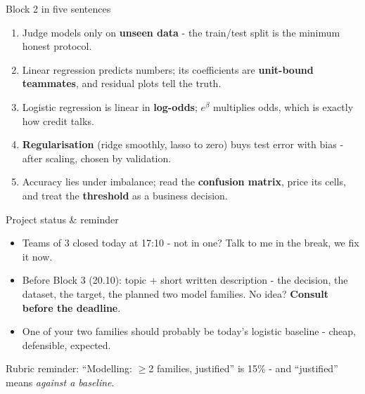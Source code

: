 \documentclass[10pt,aspectratio=169]{beamer}
\begin{document}
\begin{frame}{Block 2 in five sentences}
  \begin{enumerate}
    \item Judge models only on \textbf{unseen data} - the train/test split
          is the minimum honest protocol.
    \item Linear regression predicts numbers; its coefficients are
          \textbf{unit-bound teammates}, and residual plots tell the truth.
    \item Logistic regression is linear in \textbf{log-odds}; $e^{\beta}$
          multiplies odds, which is exactly how credit talks.
    \item \textbf{Regularisation} (ridge smoothly, lasso to zero) buys test
          error with bias - after scaling, chosen by validation.
    \item Accuracy lies under imbalance; read the \textbf{confusion matrix},
          price its cells, and treat the \textbf{threshold} as a business
          decision.
  \end{enumerate}
\end{frame}

\begin{frame}{Project status \& reminder}
  \begin{itemize}
    \item Teams of 3 closed \alert{today at 17:10} - not in one? Talk to me
          in the break, we fix it now.
    \item \alert{Before Block 3 (20.10): topic + short written description}
          - the decision, the dataset, the target, the planned two model
          families. No idea? \textbf{Consult before the deadline}.
    \item One of your two families should probably be today's logistic
          baseline - cheap, defensible, expected.
  \end{itemize}
  \vspace{0.6em}
  \begin{center}\small
    Rubric reminder: ``Modelling: $\geq$2 families, justified'' is 15\% -
    and ``justified'' means \emph{against a baseline}.
  \end{center}
\end{frame}
\end{document}
